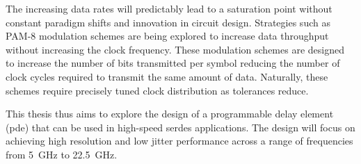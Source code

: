The increasing data rates will predictably lead to a saturation point without constant paradigm shifts and innovation in circuit design. Strategies such as PAM-8 modulation schemes are being explored to increase data throughput without increasing the clock frequency. These modulation schemes are designed to increase the number of bits transmitted per symbol reducing the number of clock cycles required to transmit the same amount of data. Naturally, these schemes require precisely tuned clock distribution as tolerances reduce.

This thesis thus aims to explore the design of a programmable delay element (\gls{pde}) that can be used in high-speed \gls{serdes} applications. The design will focus on achieving high resolution and low jitter performance across a range of frequencies from 5~GHz to 22.5~GHz.
